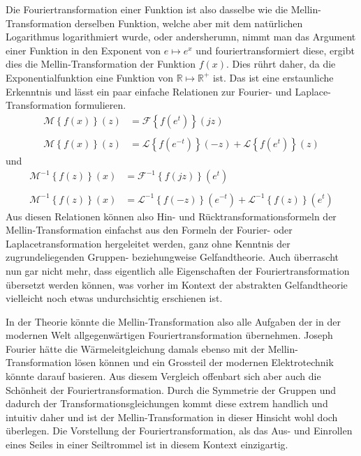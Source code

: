 Die Fouriertransformation einer Funktion ist also dasselbe wie die 
Mellin-Transformation derselben Funktion, welche aber mit dem natürlichen 
Logarithmus logarithmiert wurde, oder andersherumn, nimmt man das 
Argument einer Funktion in den Exponent von $e \mapsto e^x$ und 
fouriertransformiert diese, ergibt dies die Mellin-Transformation 
der Funktion $f(x)$.
Dies rührt daher, da die Exponentialfunktion eine Funktion von 
$\mathbb{R} \mapsto \mathbb{R^+}$ ist.
Das ist eine erstaunliche Erkenntnis und lässt ein paar einfache 
Relationen zur Fourier- und Laplace-Transformation formulieren.
\begin{align*}
    \mathcal{M}\left\{f(x)\right\}(z) 
    &= \mathcal{F}\left\{f (e^{t})\right\}(jz) \\ \\
    \mathcal{M}\left\{f(x)\right\}(z) 
    &= \mathcal{L}\left\{f (e^{-t})\right\}(-z) 
    + \mathcal{L}\left\{f (e^{t})\right\}(z) 
\end{align*}
und
\begin{align*}
    \mathcal{M}^{-1}\left\{f(z)\right\}(x) 
    &= \mathcal{F}^{-1}\left\{f (jz)\right\}(e^t) \\ \\
    \mathcal{M}^{-1}\left\{f(z)\right\}(x) 
    &= \mathcal{L}^{-1}\left\{f (-z)\right\}(e^{-t}) 
    + \mathcal{L}^{-1}\left\{f (z)\right\}(e^{t}) 
\end{align*}
Aus diesen Relationen können also Hin- und Rücktransformationsformeln 
der Mellin-Transformation einfachst aus den Formeln der Fourier- oder 
Laplacetransformation hergeleitet werden, ganz ohne Kenntnis der 
zugrundeliegenden Gruppen- beziehungweise Gelfandtheorie.
Auch überrascht nun gar nicht mehr, dass eigentlich alle Eigenschaften 
der Fouriertransformation übersetzt werden können, was vorher im Kontext 
der abstrakten Gelfandtheorie vielleicht noch etwas undurchsichtig 
erschienen ist.

In der Theorie könnte die Mellin-Transformation also alle Aufgaben der 
in der modernen Welt allgegenwärtigen Fouriertransformation übernehmen. 
Joseph Fourier hätte die Wärmeleitgleichung damals ebenso mit der 
Mellin-Transformation lösen können und ein Grossteil der modernen 
Elektrotechnik könnte darauf basieren. 
Aus diesem Vergleich offenbart sich aber auch die Schönheit der 
Fouriertransformation. 
Durch die Symmetrie der Gruppen und dadurch der Transformationsgleichungen 
kommt diese extrem handlich und intuitiv daher und ist der 
Mellin-Transformation in dieser Hinsicht wohl doch überlegen.
Die Vorstellung der Fouriertransformation, als das Aus- und 
Einrollen eines Seiles in einer Seiltrommel ist in diesem Kontext 
einzigartig.



